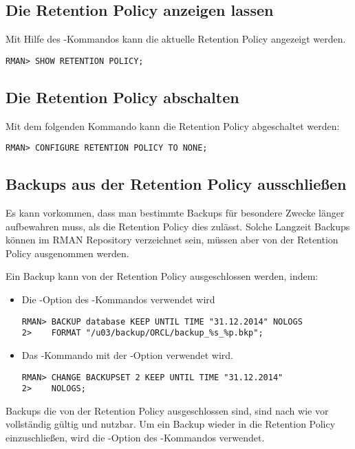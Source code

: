 			\subsection{Die Retention Policy anzeigen lassen}
        Mit Hilfe des -Kommandos kann die aktuelle Retention Policy angezeigt werden.
        \begin{lstlisting}[caption={Anzeigen der Retention Policy},label=admin1027,language=rman]
RMAN> SHOW RETENTION POLICY;
        \end{lstlisting}
      \subsection{Die Retention Policy abschalten}
        Mit dem folgenden Kommando kann die Retention Policy abgeschaltet werden:
        \begin{lstlisting}[caption={Abschalten der Retention Policy},label=admin1028,language=rman]
RMAN> CONFIGURE RETENTION POLICY TO NONE;
        \end{lstlisting}
      \subsection{Backups aus der Retention Policy ausschließen}
        Es kann vorkommen, dass man bestimmte Backups für besondere Zwecke länger aufbewahren muss, als die Retention Policy dies zulässt. Solche Langzeit Backups können im RMAN Repository verzeichnet sein, müssen aber von der Retention Policy ausgenommen werden.

        Ein Backup kann von der Retention Policy ausgeschlossen werden, indem:
        \begin{itemize}
          \item Die -Option des -Kommandos verwendet wird
            \begin{lstlisting}[caption={Ein neues Backup aus der Retention Policy ausschließen},label=admin1029,language=rman]
RMAN> BACKUP database KEEP UNTIL TIME "31.12.2014" NOLOGS
2>    FORMAT "/u03/backup/ORCL/backup_%s_%p.bkp";
            \end{lstlisting}
          \item Das -Kommando mit der -Option verwendet wird.
            \begin{lstlisting}[caption={Ein bestehendes Backup aus der Retention Policy ausschließen},label=admin1030,language=rman]
RMAN> CHANGE BACKUPSET 2 KEEP UNTIL TIME "31.12.2014"
2>    NOLOGS;
            \end{lstlisting}
        \end{itemize}
        Backups die von der Retention Policy ausgeschlossen sind, sind nach wie vor vollständig gültig und nutzbar. Um ein Backup wieder in die Retention Policy einzuschließen, wird die -Option des -Kommandos verwendet.
